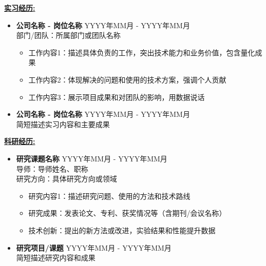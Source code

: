 \documentclass[UTF8]{ctexart}
\begin{document}
\medskip
{\large \textbf{\underline{实习经历:}}}\\
\begin{itemize}

\item \textbf{公司名称 - 岗位名称} \hfill{YYYY年MM月 - YYYY年MM月}\\
\smallskip
\small
部门/团队：所属部门或团队名称
\begin{itemize}
\small
\item 工作内容1：描述具体负责的工作，突出技术能力和业务价值，包含量化成果
\item 工作内容2：体现解决的问题和使用的技术方案，强调个人贡献
\item 工作内容3：展示项目成果和对团队的影响，用数据说话
\end{itemize}
\normalsize

\item \textbf{公司名称 - 岗位名称} \hfill{YYYY年MM月 - YYYY年MM月}\\
\smallskip
\small 简短描述实习内容和主要成果
\normalsize

\end{itemize}


\medskip
{\large \textbf{\underline{科研经历:}}}\\
\begin{itemize}

\item \textbf{研究课题名称} \hfill{YYYY年MM月 - YYYY年MM月}\\
\smallskip
\small
导师：导师姓名、职称\\
研究方向：具体研究方向或领域
\begin{itemize}
\small
\item 研究内容1：描述研究问题、使用的方法和技术路线
\item 研究成果：发表论文、专利、获奖情况等（含期刊/会议名称）
\item 技术创新：提出的新方法或改进，实验结果和性能提升数据
\end{itemize}
\normalsize

\item \textbf{研究项目/课题} \hfill{YYYY年MM月 - YYYY年MM月}\\
\smallskip
\small 简短描述研究内容和成果
\normalsize

\end{itemize}
\end{document}

